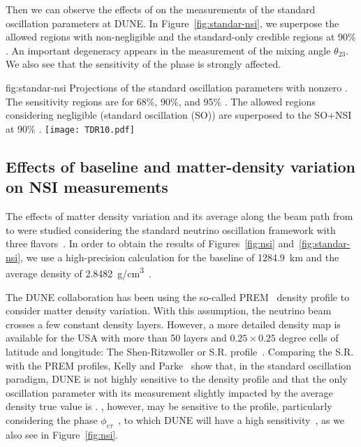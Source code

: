 Then we can observe the effects of  on the measurements of the standard oscillation parameters at DUNE. In Figure~\ref{fig:standar-nsi}, we superpose the allowed regions with non-negligible   and the standard-only credible regions at 90\% . %
An important degeneracy appears in the measurement of the mixing angle $\theta_{23}$. We also see that the sensitivity of the  phase is strongly affected.
\begin{dunefigure}
{fig:standar-nsi}
{Projections of the standard oscillation parameters with nonzero . The sensitivity regions are for 68\%, 90\%, and 95\% . The allowed regions considering negligible  (standard oscillation (SO)) are superposed to the SO+NSI at 90\% .}
\texttt{[image: TDR10.pdf]}
\end{dunefigure}

\subsection{Effects of baseline and matter-density variation on  NSI measurements}\label{ssec:matter}
The effects of matter density variation and its average along the beam path from \fnal to \surf  were studied considering the standard neutrino oscillation framework with three flavors~\cite{Roe:2017zdw,Kelly:2018kmb}. In order to obtain the results of Figures~\ref{fig:nsi} and~\ref{fig:standar-nsi}, we use a high-precision calculation for the baseline of \SI{1284.9}{km} and the average density of \SI{2.8482}{g/cm^3}~\cite{Roe:2017zdw}.

The DUNE collaboration has been using the so-called PREM~\cite{Dziewonski:1981xy,PREM2} density profile to consider matter density variation. With this assumption, the neutrino beam crosses a few constant density layers.
However, a more detailed density map is available for the USA with more than 50 layers and $0.25 \times 0.25$ degree cells of latitude and longitude: The Shen-Ritzwoller or S.R. profile~\cite{SR:2016,Roe:2017zdw}. Comparing the S.R. with the PREM profiles, Kelly and Parke~\cite{Kelly:2018kmb} show that, in the standard oscillation paradigm, DUNE is not highly sensitive to the density profile and that the only oscillation parameter with its measurement slightly impacted by the average density true value is \deltacp{}.
, however, may be sensitive to the profile, particularly considering the phase $\phi_{e\tau}$~\cite{Chatterjee:2018dyd}, to which DUNE will have a high sensitivity~\cite{Ohlsson:2012kf,Miranda:2015dra,deGouvea:2015ndi,Coloma:2015kiu,Farzan:2017xzy}, as we also see in Figure~\ref{fig:nsi}.

